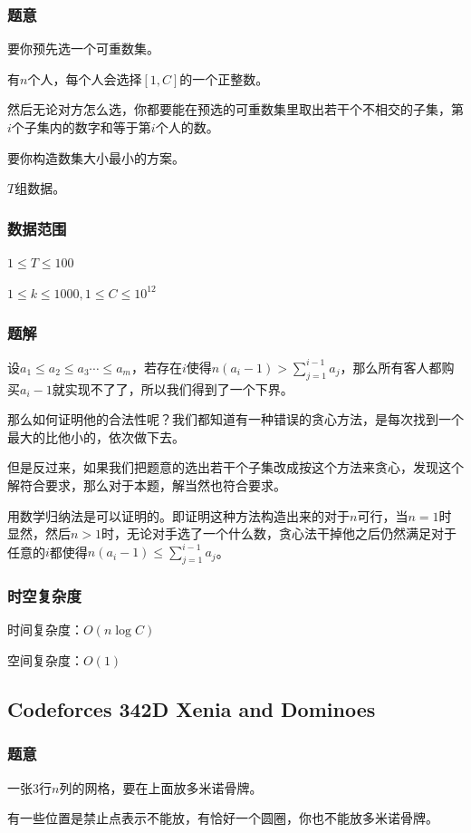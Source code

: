 \documentclass{ctexart}
\begin{document}
\subsubsection{题意}
要你预先选一个可重数集。

有$n$个人，每个人会选择$[1,C]$的一个正整数。

然后无论对方怎么选，你都要能在预选的可重数集里取出若干个不相交的子集，第$i$个子集内的数字和等于第$i$个人的数。

要你构造数集大小最小的方案。

$T$组数据。
\subsubsection{数据范围}
$1 \le T \le 100$

$1 \le k \le 1000,1 \le C \le 10^{12}$
\subsubsection{题解}
设$a_1 \le a_2 \le a_3 \cdots \le a_m$，若存在$i$使得$n(a_i-1)> \sum\limits_{j=1}^{i-1} a_j$，那么所有客人都购买$a_i-1$就实现不了了，所以我们得到了一个下界。

那么如何证明他的合法性呢？我们都知道有一种错误的贪心方法，是每次找到一个最大的比他小的，依次做下去。

但是反过来，如果我们把题意的选出若干个子集改成按这个方法来贪心，发现这个解符合要求，那么对于本题，解当然也符合要求。

用数学归纳法是可以证明的。即证明这种方法构造出来的对于$n$可行，当$n=1$时显然，然后$n>1$时，无论对手选了一个什么数，贪心法干掉他之后仍然满足对于任意的$i$都使得$n(a_i-1) \le \sum\limits_{j=1}^{i-1} a_j$。
\subsubsection{时空复杂度}
时间复杂度：$O(n \log C)$

空间复杂度：$O(1)$

\subsection{Codeforces 342D Xenia and Dominoes}
\subsubsection{题意}
一张$3$行$n$列的网格，要在上面放多米诺骨牌。

有一些位置是禁止点表示不能放，有恰好一个圆圈，你也不能放多米诺骨牌。
\end{document}
